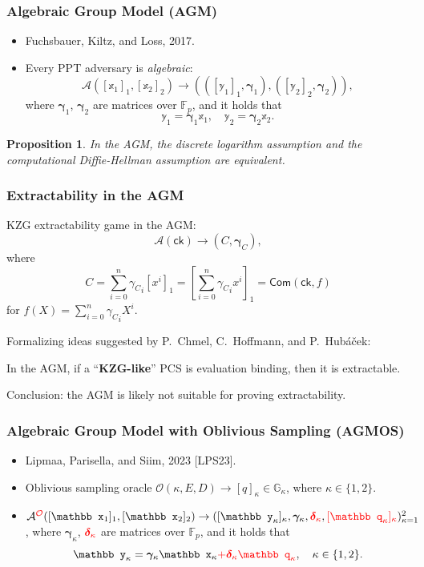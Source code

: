 \documentclass[9pt]{beamer}
\newcommand{\red}[1]{\textcolor{red!}{#1}}
\newcommand{\F}{\mathbb{F}}
\newcommand{\G}{\mathbb{G}}
\newcommand{\Com}{\mathsf{Com}}
\newcommand{\ck}{\mathsf{ck}}  %
\newcommand{\A}{\mathcal A}  %
\newcommand{\Oracle}{\mathcal{O}}  %
\newtheorem{proposition}{Proposition}
\begin{document}
\begin{frame}
\frametitle{Algebraic Group Model (AGM)}
\begin{itemize}
    \item Fuchsbauer, Kiltz, and Loss, 2017.
    \item Every PPT adversary is \textit{algebraic}:
    $$
    \A([\mathbb x_1]_1, [\mathbb x_2]_2) \to (([\mathbb y_1]_1, \bm \gamma_1), ([\mathbb y_2]_2, \bm \gamma_2)),
    $$
    where $ \bm{\gamma}_1 $, $ \bm{\gamma}_2 $ are matrices over $ \F_p $, and it holds that 
    \begin{equation*}
    \mathbb y_1 = \bm{\gamma}_1 \mathbb x_1, \quad 
    \mathbb y_2 = \bm{\gamma}_2 \mathbb x_2. 
    \end{equation*}
\end{itemize}
\begin{proposition}
    In the AGM, the discrete logarithm assumption and the computational Diffie-Hellman assumption are equivalent.
\end{proposition}
\end{frame}


\begin{frame}
\frametitle{Extractability in the AGM}
KZG extractability game in the AGM:
\[
\A(\ck) \to (C, \bm \gamma_C),
\]
where 
\[
C = \sum_{i=0}^n {\gamma_C}_i [x^i]_1 = 
\left[ \sum_{i=0}^n {\gamma_C}_i x^i \right]_1 = 
\Com(\ck, f)
\]
for $ f(X) = \sum_{i=0}^n {\gamma_C}_i X^i $.

Formalizing ideas suggested by P.\ Chmel, C.\ Hoffmann, and P.\ Hubáček:
\begin{theorem}[informal]
In the AGM, if a ``\textbf{KZG-like}'' PCS is evaluation binding, then it is extractable.
\end{theorem}
Conclusion: the AGM is likely not suitable for proving extractability. 
\end{frame}


\begin{frame}
\frametitle{Algebraic Group Model with Oblivious Sampling (AGMOS)}
\begin{itemize}
    \item Lipmaa, Parisella, and Siim, 2023 [LPS23].
    \item Oblivious sampling oracle $ \Oracle(\kappa, E, D) \to [q]_\kappa \in \G_\kappa $, where $ \kappa \in \{ 1, 2 \} $.
    \item \(
    \A^{\red{\Oracle}}([\mathbb x_1]_1, [\mathbb x_2]_2) \to
    ([\mathbb y_\kappa]_\kappa, \bm \gamma_\kappa, \red{\bm \delta_\kappa}, \red{[\mathbb q_\kappa]_\kappa})_{\kappa=1}^2
    \), where $ \bm{\gamma}_\kappa $, $ \red{\bm{\delta}_\kappa} $ are matrices over $ \F_p $, and it holds that 
    \begin{equation*}
    \mathbb y_\kappa = \bm{\gamma}_\kappa \mathbb x_\kappa \red{+ \bm \delta_\kappa \mathbb q_\kappa}, \quad 
    \kappa \in \{ 1, 2 \}.
    \end{equation*}
\end{itemize}   
\end{frame}
\end{document}
